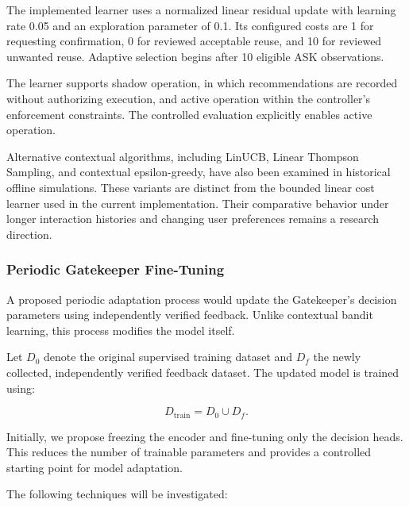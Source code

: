 \documentclass[10pt,conference]{IEEEtran}
\begin{document}
The implemented learner uses a normalized
linear residual update with learning rate
0.05 and an exploration parameter of 0.1.
Its configured costs are 1 for requesting
confirmation, 0 for reviewed acceptable
reuse, and 10 for reviewed unwanted reuse.
Adaptive selection begins after 10 eligible
ASK observations.

The learner supports shadow operation,
in which recommendations are recorded
without authorizing execution, and active
operation within the controller's
enforcement constraints. The controlled
evaluation explicitly enables active
operation.

Alternative contextual algorithms, including
LinUCB, Linear Thompson Sampling, and
contextual epsilon-greedy, have also been
examined in historical offline simulations.
These variants are distinct from the bounded
linear cost learner used in the current
implementation. Their comparative behavior
under longer interaction histories and
changing user preferences remains a
research direction.


\subsubsection{Periodic Gatekeeper Fine-Tuning}

A proposed periodic adaptation process would
update the Gatekeeper's decision parameters
using independently verified feedback. Unlike contextual bandit learning, this process modifies the model itself.

Let $D_0$ denote the original supervised training dataset and $D_f$ the newly collected, independently verified feedback dataset. The updated model is trained using:

\begin{equation}
D_{\mathrm{train}} = D_0 \cup D_f.
\end{equation}

Initially, we propose freezing the encoder and fine-tuning only the decision heads. This reduces the number of trainable parameters and provides a controlled starting point for model adaptation.

The following techniques will be investigated:
\end{document}
